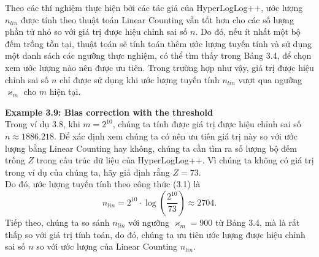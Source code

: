 \documentclass[a4paper,13pt]{article}
\theoremstyle{mytheor}
\begin{document}
\indent Theo các thí nghiệm thực hiện bởi các tác giả của HyperLogLog++, ước lượng $n_{lin}$ được tính theo thuật toán 
Linear Counting vẫn tốt hơn cho các số lượng phần tử nhỏ so với giá trị được hiệu chỉnh sai số $n$. Do đó, nếu ít nhất một bộ đếm trống tồn tại, 
thuật toán sẽ tính toán thêm ước lượng tuyến tính và sử dụng một danh sách các ngưỡng thực nghiệm, có thể tìm thấy trong Bảng 3.4, để chọn xem ước lượng 
nào nên được ưu tiên. Trong trường hợp như vậy, giá trị được hiệu chỉnh sai số $n$ chỉ được sử dụng khi ước lượng tuyến tính $n_{lin}$ 
vượt qua ngưỡng $\varkappa_m$ cho $m$ hiện tại.
\begin{mdframed}
    \vspace{0.25cm}
    \textbf{Example 3.9: Bias correction with the threshold}\\
    Trong ví dụ 3.8, khi $m = 2^{10}$, chúng ta tính được giá trị được hiệu chỉnh sai số $n \approx 1886.218$. Để xác định xem chúng ta có nên 
    ưu tiên giá trị này so với ước lượng bằng Linear Counting hay không, chúng ta cần tìm ra số lượng bộ đếm trống $Z$ trong cấu trúc dữ liệu của 
    HyperLogLog++. Vì chúng ta không có giá trị trong ví dụ của chúng ta, hãy giả định rằng $Z = 73$.\\
    Do đó, ước lượng tuyến tính theo công thức (3.1) là
    \[n_{lin} = 2^{10} \cdot \log\left(\frac{2^{10}}{73}\right) \approx 2704.\]
    Tiếp theo, chúng ta so sánh $n_{lin}$ với ngưỡng $\varkappa_m = 900$ từ Bảng 3.4, mà là rất thấp so với giá trị tính toán, do đó, 
    chúng ta ưu tiên ước lượng được hiệu chỉnh sai số $n$ so với ước lượng của Linear Counting $n_{lin}$.
    
\end{mdframed}
    
\end{document}
